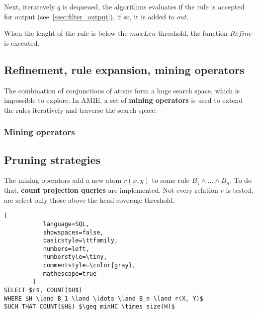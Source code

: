 \documentclass{article}
\begin{document}
Next, iteratevely $q$ is dequeued, the algorithms evaluates if the
rule is accepted for output (see~\ref{ssec:filter_output}), if so, it is added
to $out$.

When the lenght of the rule is below the $maxLen$ threshold, the function $Refine$
is executed.


\subsection{Refinement, rule expansion, mining operators}


The combination of conjunctions of atoms form a huge search space, which is
impossible to explore. In AMIE, a set of \textbf{mining operators} is used to
extend the rules iteratively and traverse the search space.

\subsubsection{Mining operators}
\subsection{Pruning strategies}

The mining operators add a new atom $r(x, y)$ to some rule $B_1 \land \ldots
\land B_n$. To do that, \textbf{count projection queries} are implemented. Not
every relation $r$ is tested, are select only those above the head-coverage threshold.


\begin{lstlisting}[
           language=SQL,
           showspaces=false,
           basicstyle=\ttfamily,
           numbers=left,
           numberstyle=\tiny,
           commentstyle=\color{gray},
           mathescape=true
        ]
SELECT $r$, COUNT($H$)
WHERE $H \land B_1 \land \ldots \land B_n \land r(X, Y)$
SUCH THAT COUNT($H$) $\geq minHC \times size(H)$
\end{lstlisting}
\end{document}
